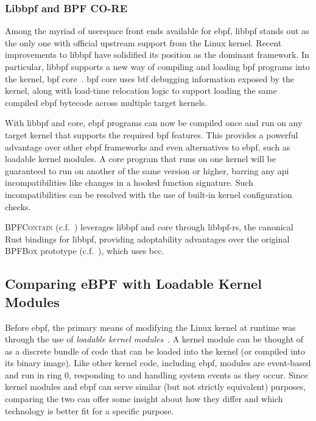 \documentclass[
  fontsize=12pt,
  titlepage=firstiscover,
  paper=letter,
oneside,
  cleardoublepage=plain,
  parskip=half-,
  DIV=10,
  parindent,
  appendixprefix,
  chapterprefix,
  listof=totoc,
]{scrbook}
\newcommand{\bpfbox}{\textsc{BPFBox}}
\newcommand{\bpfcontain}{\textsc{BPFContain}}
\begin{document}
\subsubsection*{Libbpf and BPF CO-RE}

Among the myriad of userspace front ends available for \gls{ebpf}, libbpf stands out as the only
one with official upstream support from the Linux kernel. Recent improvements to libbpf
have solidified its position as the dominant framework. In particular, libbpf supports
a new way of compiling and loading \gls{bpf} programs into the kernel, \gls{bpf}
\gls{core}~\cite{gregg2020_core, nakryiko2020_core}. \gls{bpf} \gls{core} uses \gls{btf}
debugging information exposed by the kernel, along with load-time relocation logic to
support loading the same compiled \gls{ebpf} bytecode across multiple target kernels.

With libbpf and \gls{core}, \gls{ebpf} programs can now be compiled once and run on any target kernel
that supports the required \gls{bpf} features. This provides a powerful advantage over other
\gls{ebpf} frameworks and even alternatives to \gls{ebpf}, such as loadable kernel modules. A \gls{core}
program that runs on one kernel will be guaranteed to run on another of the same version
or higher, barring any \gls{api} incompatibilities like changes in a hooked function signature.
Such incompatibilities can be resolved with the use of built-in kernel configuration
checks.

\bpfcontain{} (c.f.\ ) leverages libbpf and \gls{core} through libbpf-rs, the
canonical Rust bindings for libbpf, providing adoptability advantages over the original
\bpfbox{} prototype (c.f.\ ), which uses bcc.

\subsection{Comparing eBPF with Loadable Kernel Modules}\label{ss:bpf-vs-modules}

Before \gls{ebpf}, the primary means of modifying the Linux kernel at runtime was through the
use of \textit{loadable kernel modules}~\cite{corbet1998_device_drivers}. A kernel module
can be thought of as a discrete bundle of code that can be loaded into the kernel (or
compiled into its binary image). Like other kernel code, including \gls{ebpf}, modules are
event-based and run in ring 0, responding to and handling system events as they occur.
Since kernel modules and \gls{ebpf} can serve similar (but not strictly equivalent) purposes,
comparing the two can offer some insight about how they differ and which technology is
better fit for a specific purpose.
\end{document}
